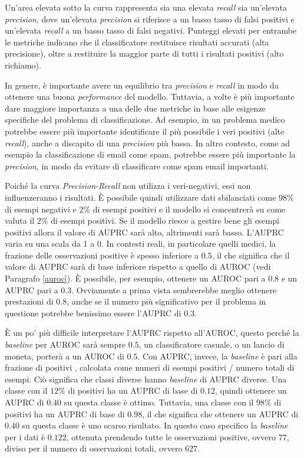 \documentclass[12pt,italian]{report}
\begin{document}
	Un'area elevata sotto la curva rappresenta sia una elevata \textit{recall} sia un'elevata \textit{precision}, dove un'elevata \textit{precision} si riferisce a un basso tasso di falsi positivi e un'elevata \textit{recall} a un basso tasso di falsi negativi. Punteggi elevati per entrambe le metriche indicano che il classificatore restituisce risultati accurati (alta precisione), oltre a restituire la maggior parte di tutti i risultati positivi (alto richiamo).
	
	In genere, è importante avere un equilibrio tra \textit{precision} e \textit{recall} in modo da ottenere una buona \textit{performance} del modello. Tuttavia, a volte è  più importante dare maggiore importanza a una delle due metriche in base alle esigenze specifiche del problema di classificazione. Ad esempio, in un problema medico potrebbe essere più importante identificare il più possibile i veri positivi (alte \textit{recall}), anche a discapito di una \textit{precision} più bassa. In altro contesto, come ad esempio la classificazione di email come spam, potrebbe essere più importante la \textit{precision}, in modo da evitare di classificare come spam email importanti.

	Poiché la curva \textit{Precision-Recall} non utilizza i veri-negativi, essi non influenzeranno i risultati. È possibile quindi utilizzare dati sbilanciati come $98\%$ di esempi negativi e $2\%$ di esempi positivi e il modello si concentrerà su come valuta il $2\%$ di esempi positivi. Se il modello riesce a gestire bene gli esempi positivi allora il valore di AUPRC sarà alto, altrimenti sarà basso. L'AUPRC varia su una scala da 1 a 0. In contesti reali, in particolare quelli medici, la frazione delle osservazioni positive è spesso inferiore a $0.5$, il che significa che il valore di AUPRC sarà di base inferiore rispetto a quello di AUROC (vedi Paragrafo \ref{auroc}). È possibile, per esempio, ottenere un AUROC pari a $0.8$ e un AUPRC pari a $0.3$. Ovviamente a prima vista sembrerebbe meglio ottenere prestazioni di 0.8, anche se il numero più significativo per il problema in questione potrebbe benissimo essere l'AUPRC di $0.3$. 
	
	È un po' più difficile interpretare l'AUPRC rispetto all'AUROC, questo perché la \textit{baseline} per AUROC sarà sempre $0.5$, un classificatore casuale, o un lancio di moneta, porterà a un AUROC di $0.5$. Con AUPRC, invece, la \textit{baseline} è pari alla frazione di positivi \cite{10.1371/journal.pone.0118432}, calcolata come numeri di esempi positivi / numero totali di esempi. Ciò significa che classi diverse hanno \textit{baseline} di AUPRC diverse. Una classe con il $12\%$ di positivi ha un AUPRC di base di $0.12$, quindi ottenere un AUPRC di $0.40$ su questa classe è ottimo. Tuttavia, una classe con il $98\%$ di positivi ha un AUPRC di base di $0.98$, il che significa che ottenere un AUPRC di $0.40$ su questa classe è uno scarso risultato. In questo caso specifico la \textit{baseline} per i dati è $0.122$, ottenuta prendendo tutte le osservazioni positive, ovvero $77$, diviso per il numero di osservazioni totali, ovvero $627$.
	
\end{document}
